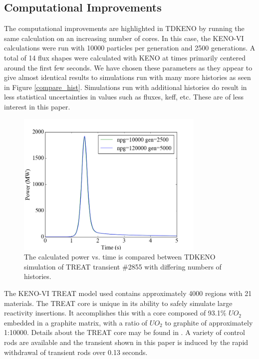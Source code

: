 \documentclass{anstrans}
\begin{document}
\subsection{Computational Improvements}

The computational improvements are highlighted in TDKENO by running the same calculation on an increasing number of cores.  In this case, the KENO-VI calculations were run with 10000 particles per generation and 2500 generations. A total of 14 flux shapes were calculated with KENO at times primarily centered around the first few seconds.  We have chosen these parameters as they appear to give almost identical results to simulations run with many more histories as seen in Figure \ref{compare_hist}.  Simulations run with additional histories do result in less statistical uncertainties in values such as fluxes, keff, etc.  These are of less interest in this paper.  

\begin{figure}[h]
    \centering
    \includegraphics[width=9cm]{figures/comp_npg2855.png}
    \caption{The calculated power vs. time is compared between TDKENO simulation of TREAT transient \#2855 with differing numbers of histories. }
\end{figure}

The KENO-VI TREAT model used contains approximately 4000 regions with 21 materials.  The TREAT core is unique in its ability to safely simulate large reactivity insertions.  It accomplishes this with a core composed of 93.1\% $UO_2$ embedded in a graphite matrix, with a ratio of $UO_2$ to graphite of approximately 1:10000.  Details about the TREAT core may be found in \cite{bess2015baseline}.  A variety of control rods are available and the transient shown in this paper is induced by the rapid withdrawal of transient rods over 0.13 seconds. 
\end{document}
